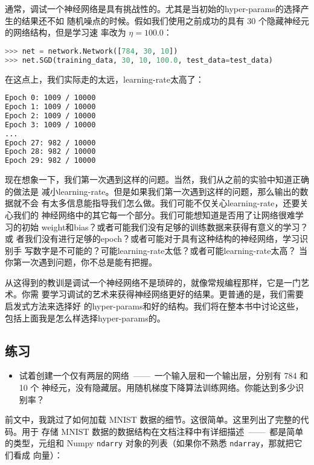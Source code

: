 通常，调试一个神经网络是具有挑战性的。尤其是当初始的\gls*{hyper-params}的选择产生的结果还不如
随机噪点的时候。假如我们使用之前成功的具有 30 个隐藏神经元的网络结构，但是学习速
率改为 $\eta = 100.0$：

\begin{lstlisting}[language=Python]
>>> net = network.Network([784, 30, 10])
>>> net.SGD(training_data, 30, 10, 100.0, test_data=test_data)
\end{lstlisting}

在这点上，我们实际走的太远，\gls*{learning-rate}太高了：

\begin{lstlisting}[language=sh]
Epoch 0: 1009 / 10000
Epoch 1: 1009 / 10000
Epoch 2: 1009 / 10000
Epoch 3: 1009 / 10000
...
Epoch 27: 982 / 10000
Epoch 28: 982 / 10000
Epoch 29: 982 / 10000
\end{lstlisting}

现在想象一下，我们第一次遇到这样的问题。当然，我们从之前的实验中知道正确的做法是
减小\gls*{learning-rate}。但是如果我们第一次遇到这样的问题，那么输出的数据就不会
有太多信息能指导我们怎么做。我们可能不仅关心\gls*{learning-rate}，还要关心我们的
神经网络中的其它每一个部分。我们可能想知道是否用了让网络很难学习的初始%
\gls*{weight}和\gls*{bias}？或者可能我们没有足够的训练数据来获得有意义的学习？或
者我们没有进行足够的\gls*{epoch}？或者可能对于具有这种结构的神经网络，学习识别手
写数字是不可能的？可能\gls*{learning-rate}太低？或者可能\gls*{learning-rate}太高？
当你第一次遇到问题，你不总是能有把握。

从这得到的教训是调试一个神经网络不是琐碎的，就像常规编程那样，它是一门艺术。你需
要学习调试的艺术来获得神经网络更好的结果。更普通的是，我们需要启发式方法来选择好
的\gls*{hyper-params}和好的结构。我们将在整本书中讨论这些，包括上面我是怎么样选择\gls*{hyper-params}的。

\subsection*{练习}

\begin{itemize}
\item 试着创建一个仅有两层的网络~——~一个输入层和一个输出层，分别有 784 和 10 个
  神经元，没有隐藏层。用随机梯度下降算法训练网络。你能达到多少识别率？
\end{itemize}

前文中，我跳过了如何加载 MNIST 数据的细节。这很简单。这里列出了完整的代码。用于
存储 MNIST 数据的数据结构在文档注释中有详细描述~——~都是简单的类型，元组和 Numpy
\lstinline!ndarry! 对象的列表（如果你不熟悉 \lstinline!ndarray!，那就把它们看成
  向量）：

